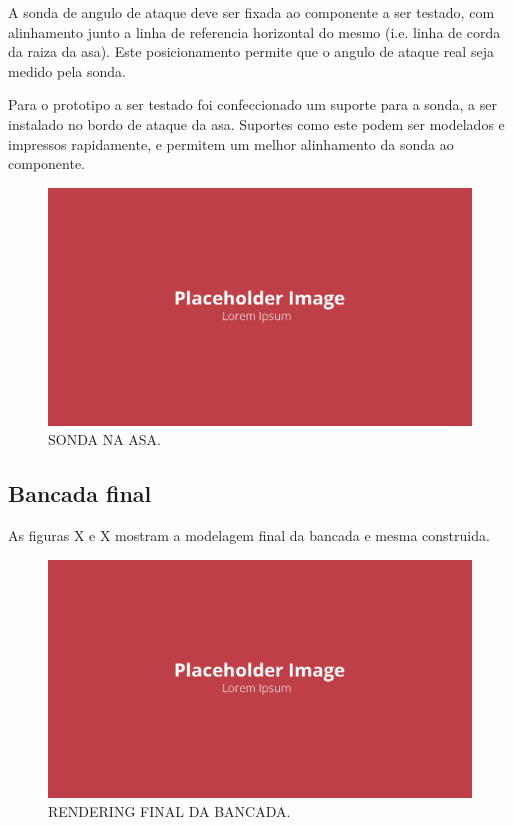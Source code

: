 A sonda de angulo de ataque deve ser fixada ao componente a ser testado, com alinhamento junto a linha de referencia horizontal do mesmo (i.e. linha de corda da raiza da asa). Este posicionamento permite que o angulo de ataque real seja medido pela sonda. 

Para o prototipo a ser testado foi confeccionado um suporte para a sonda, a ser instalado no bordo de ataque da asa. Suportes como este podem ser modelados e impressos rapidamente, e permitem um melhor alinhamento da sonda ao componente.

\begin{figure}[!ht]
    \centering
    \includegraphics[width=.8\linewidth]{figuras/placeholder.png}
    \caption{SONDA NA ASA\cite{autor}.}
    \label{fig:placeholder}
\end{figure}

\subsection{Bancada final}

As figuras X e X mostram a modelagem final da bancada e mesma construida.

\begin{figure}[!ht]
    \centering
    \includegraphics[width=.8\linewidth]{figuras/placeholder.png}
    \caption{RENDERING FINAL DA BANCADA\cite{autor}.}
    \label{fig:placeholder}
\end{figure}

